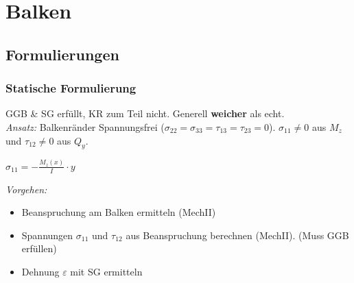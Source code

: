 \section{Balken}
    \subsection{Formulierungen}
        \subsubsection{Statische Formulierung}
            GGB \& SG erfüllt, KR zum Teil nicht. Generell \textbf{weicher} als echt.
            \\\textit{Ansatz:} Balkenränder Spannungsfrei ($\sigma_{22}=\sigma_{33}=\tau_{13}=\tau_{23}=0$). $\sigma_{11} \neq 0$ aus $M_z$ und $\tau_{12} \neq 0$ aus $Q_y$.
            \begin{center}
                $\displaystyle\sigma_{11}=-\frac{M_z(x)}{I}\cdot y$
            \end{center}
            \vspace{-3mm}
            \textit{Vorgehen:}
            \vspace{-2mm}
            \begin{itemize}
                \item Beanspruchung am Balken ermitteln (MechII)
                \item Spannungen $\sigma_{11}$ und $\tau_{12}$ aus Beanspruchung berechnen (MechII). (Muss GGB erfüllen)
                \item Dehnung $\varepsilon$ mit SG ermitteln
            \end{itemize}
